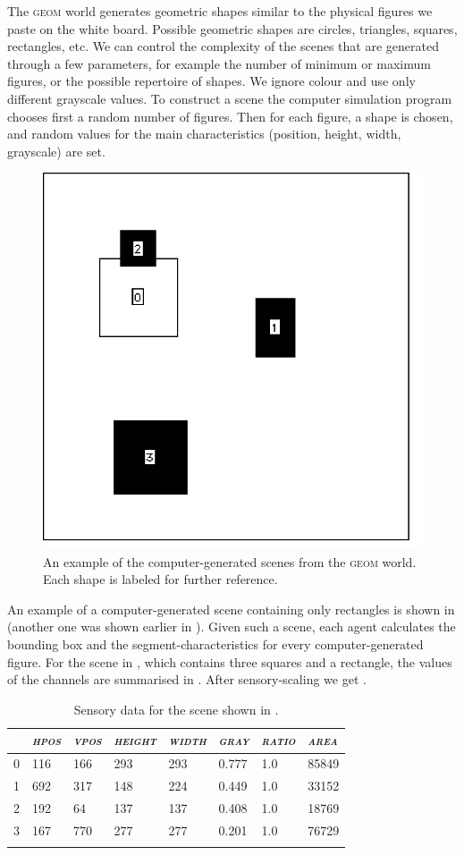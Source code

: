 The \textsc{geom} world generates geometric shapes similar 
to the physical figures we paste on the white board. 
Possible geometric shapes are circles, triangles, 
squares, rectangles, etc. 
We can control the complexity
of the scenes that are generated  through a few parameters, for example the 
number of minimum or maximum figures, or the possible 
repertoire of shapes. We 
ignore colour and use only different grayscale 
values. To construct a scene the computer simulation 
program chooses first a random number of 
figures. Then for each figure, a shape is 
chosen, and random values for the main 
characteristics (position, height, width, grayscale)
are set. 

\begin{figure}[t]
  \centerline{\includegraphics[width=.45\textwidth]{chap3/figs/scene9.pdf}}
\caption{\label{geom3}An example of the 
computer-generated scenes from the \textsc{geom} world.
Each shape is labeled for further reference.}
\end{figure}

An example of a computer-generated 
scene containing only rectangles is shown in 
 (another one 
was shown earlier in ).
Given such a scene, each agent calculates
the bounding box and the segment-characteristics
for every computer-generated figure.
For the scene in , which contains three
squares and a rectangle, the values of the channels
are summarised in . After sensory-scaling we get . 

\begin{table}[b]
\begin{center}
\begin{tabular}{  l   l   l   l   l   l   l   l  }
\lsptoprule
 & {\itshape \textsc{hpos}} & {\itshape \textsc{vpos}} & {\itshape \textsc{height}} & {\itshape \textsc{width}} & {\itshape \textsc{gray}} & {\itshape \textsc{ratio}}  & {\itshape \textsc{area}} \\ \midrule
0 & 116 & 166 & 293 & 293 & 0.777 & 1.0 & 85849 \\ 
1 & 692 & 317 & 148 & 224 & 0.449 & 1.0 & 33152 \\ 
2 & 192 & 64 & 137 & 137 & 0.408 & 1.0 & 18769 \\ 
3 & 167 & 770 & 277 & 277 & 0.201 & 1.0 & 76729 \\ 
\lspbottomrule
\end{tabular}
\end{center}
\caption{\label{tab:t-geom}Sensory data for the scene shown in .}
\end{table}

